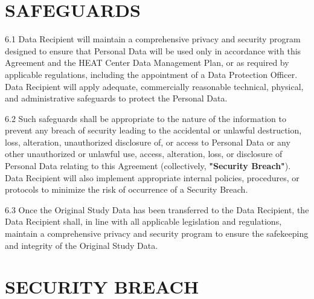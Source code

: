 \section{SAFEGUARDS}

6.1 Data Recipient will maintain a comprehensive privacy and security program designed to ensure that Personal Data will be used only in accordance with this Agreement and the HEAT Center Data Management Plan, or as required by applicable regulations, including the appointment of a Data Protection Officer. Data Recipient will apply adequate, commercially reasonable technical, physical, and administrative safeguards to protect the Personal Data.

6.2 Such safeguards shall be appropriate to the nature of the information to prevent any breach of security leading to the accidental or unlawful destruction, loss, alteration, unauthorized disclosure of, or access to Personal Data or any other unauthorized or unlawful use, access, alteration, loss, or disclosure of Personal Data relating to this Agreement (collectively, \textbf{"Security Breach"}). Data Recipient will also implement appropriate internal policies, procedures, or protocols to minimize the risk of occurrence of a Security Breach.

6.3 Once the Original Study Data has been transferred to the Data Recipient, the Data Recipient shall, in line with all applicable legislation and regulations, maintain a comprehensive privacy and security program to ensure the safekeeping and integrity of the Original Study Data.




\section{SECURITY BREACH}

